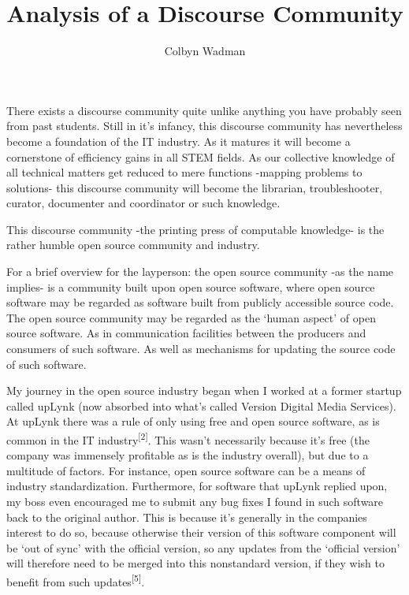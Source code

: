 \documentclass[american, 12pt]{article}
\begin{document}
\title{Analysis of a Discourse Community}
\author{Colbyn Wadman}
\maketitle



There exists a discourse community quite unlike anything you have probably seen from past students. Still in it’s infancy, this discourse community has nevertheless become a foundation of the IT industry. As it matures it will become a cornerstone of efficiency gains in all STEM fields. As our collective knowledge of all technical matters get reduced to mere functions -mapping problems to solutions- this discourse community will become the librarian, troubleshooter, curator, documenter and coordinator or such knowledge. 

This discourse community -the printing press of computable knowledge- is the rather humble open source community and industry.

For a brief overview for the layperson: the open source community -as the name implies- is a community built upon open source software, where open source software may be regarded as software built from publicly accessible source code. The open source community may be regarded as the ‘human aspect’ of open source software. As in communication facilities between the producers and consumers of such software. As well as mechanisms for updating the source code of such software.

My journey in the open source industry began when I worked at a former startup called upLynk (now absorbed into what's called Version Digital Media Services). At upLynk there was a rule of only using free and open source software, as is common in the IT industry\textsuperscript{[2]}. This wasn’t necessarily because it’s free (the company was immensely profitable as is the industry overall), but due to a multitude of factors. For instance, open source software can be a means of industry standardization. Furthermore, for software that upLynk replied upon, my boss even encouraged me to submit any bug fixes I found in such software back to the original author. This is because it’s generally in the companies interest to do so, because otherwise their version of this software component will be ‘out of sync’ with the official version, so any updates from the ‘official version’ will therefore need to be merged into this nonstandard version, if they wish to benefit from such updates\textsuperscript{[5]}.
\end{document}
